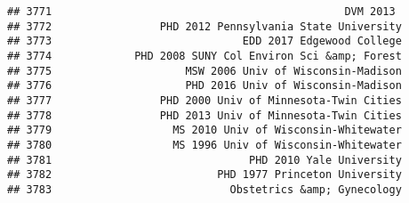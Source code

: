 \documentclass[
]{article}
\begin{document}
\begin{verbatim}
## 3771                                              DVM 2013 
## 3772                 PHD 2012 Pennsylvania State University
## 3773                              EDD 2017 Edgewood College
## 3774             PHD 2008 SUNY Col Environ Sci &amp; Forest
## 3775                     MSW 2006 Univ of Wisconsin-Madison
## 3776                     PHD 2016 Univ of Wisconsin-Madison
## 3777                 PHD 2000 Univ of Minnesota-Twin Cities
## 3778                 PHD 2013 Univ of Minnesota-Twin Cities
## 3779                   MS 2010 Univ of Wisconsin-Whitewater
## 3780                   MS 1996 Univ of Wisconsin-Whitewater
## 3781                               PHD 2010 Yale University
## 3782                          PHD 1977 Princeton University
## 3783                            Obstetrics &amp; Gynecology
\end{verbatim}
\end{document}
